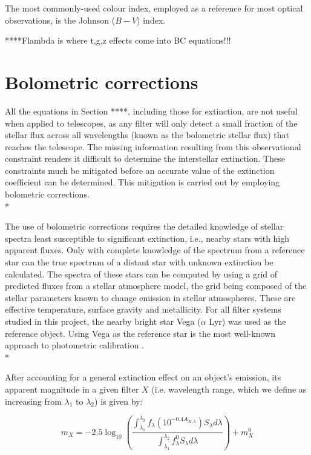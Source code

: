 \documentclass[12pt, a4paper]{report}
\begin{document}
The most commonly-used colour index, employed as a reference for most optical observations, is the Johnson ($B-V$) index.

****Flambda is where t,g,z effects come into BC equations!!!

\section{Bolometric corrections} \label{BC_theory}
All the equations in Section ****, including those for extinction, are not useful when applied to telescopes, as any filter will only detect a small fraction of the stellar flux across all wavelengths (known as the bolometric stellar flux) that reaches the telescope. The missing information resulting from this observational constraint renders it difficult to determine the interstellar extinction. These constraints much be mitigated before an accurate value of the extinction coefficient can be determined. This mitigation is carried out by employing bolometric corrections.\\*

The use of bolometric corrections requires the detailed knowledge of stellar spectra least susceptible to significant extinction, i.e., nearby stars with high apparent fluxes. Only with complete knowledge of the spectrum from a reference star can the true spectrum of a distant star with unknown extinction be calculated. The spectra of these stars can be computed by using a grid of predicted fluxes from a stellar atmosphere model, the grid being composed of the stellar parameters known to change emission in stellar atmospheres. These are effective temperature, surface gravity and metallicity. For all filter systems studied in this project, the nearby bright star Vega ($\alpha$ Lyr) was used as the reference object. Using Vega as the reference star is the most well-known approach to photometric calibration \citep{2014MNRAS.444..392C}.\\*

After accounting for a general extinction effect on an object's emission, its apparent magnitude in a given filter $X$ (i.e. wavelength range, which we define as increasing from $\lambda _{1}$ to $\lambda _{2}$) is given by:

\begin{equation}
m_{X} = -2.5 \log_{10} \left(\frac{ \int_{\lambda_{1}}^{\lambda_{2}} f_{\lambda} \left( 10^{-0.4 A_{X,\lambda}} \right) S_{\lambda} d\lambda }{ \int_{\lambda_{1}}^{\lambda_{2}} f_{\lambda}^{0} S_{\lambda} d\lambda }\right) + m_{X}^{0}
\label{app_mag_def}
\end{equation}
\end{document}
